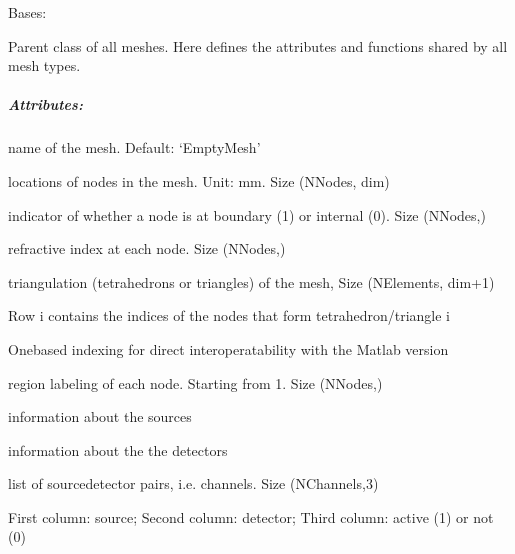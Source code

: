 \documentclass[letterpaper,10pt,english]{sphinxmanual}
\begin{document}
\begin{fulllineitems}
\label{\detokenize{_autosummary/nirfasterff.base.mesh.mesh:nirfasterff.base.mesh.mesh}}
\pysigstartsignatures
\pysigline
{}
\pysigstopsignatures
\sphinxAtStartPar
Bases: 

\sphinxAtStartPar
Parent class of all meshes. Here defines the attributes and functions shared by all mesh types.


\subparagraph{Attributes:}
\label{\detokenize{_autosummary/nirfasterff.base.mesh.mesh:attributes}}\begin{description}
\sphinxAtStartPar
name of the mesh. Default: ‘EmptyMesh’

\sphinxAtStartPar
locations of nodes in the mesh. Unit: mm. Size (NNodes, dim)

\sphinxAtStartPar
indicator of whether a node is at boundary (1) or internal (0). Size (NNodes,)

\sphinxAtStartPar
refractive index at each node. Size (NNodes,)

\sphinxAtStartPar
triangulation (tetrahedrons or triangles) of the mesh, Size (NElements, dim+1)

\sphinxAtStartPar
Row i contains the indices of the nodes that form tetrahedron/triangle i

\sphinxAtStartPar
One\sphinxhyphen{}based indexing for direct interoperatability with the Matlab version

\sphinxAtStartPar
region labeling of each node. Starting from 1. Size (NNodes,)

\sphinxAtStartPar
information about the sources

\sphinxAtStartPar
information about the the detectors

\sphinxAtStartPar
list of source\sphinxhyphen{}detector pairs, i.e. channels. Size (NChannels,3)

\sphinxAtStartPar
First column: source; Second column: detector; Third column: active (1) or not (0)


\end{description}
\end{fulllineitems}
\end{document}
